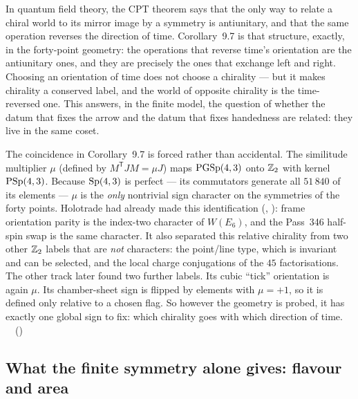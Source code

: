 \begin{physical}
In quantum field theory, the CPT theorem says that the only way to relate a chiral world to
its mirror image by a symmetry is antiunitary, and that the same operation reverses the
direction of time. Corollary~9.7 is that structure, exactly, in the forty-point geometry: the
operations that reverse time's orientation are the antiunitary ones, and they are precisely
the ones that exchange left and right. Choosing an orientation of time does not choose a
chirality --- but it makes chirality a conserved label, and the world of opposite chirality
is the time-reversed one. This answers, in the finite model, the question of whether the
datum that fixes the arrow and the datum that fixes handedness are related: they live in the
same coset. \tierB
\end{physical}

The coincidence in Corollary~9.7 is forced rather than accidental. The similitude multiplier $\mu$
(defined by $M^{\mathsf T}JM=\mu J$) maps $\mathrm{PGSp}(4,3)$ onto $\mathbb{Z}_2$ with kernel $\mathrm{PSp}(4,3)$. Because
$\mathrm{Sp}(4,3)$ is perfect --- its commutators generate all $51\,840$ of its elements --- $\mu$ is the \emph{only}
nontrivial sign character on the symmetries of the forty points. Holotrade had already made this
identification (, ): frame orientation parity is the index-two character of
$W(E_6)$, and the Pass~346 half-spin swap is the same character. It also separated this relative chirality
from two other $\mathbb{Z}_2$ labels that are \emph{not} characters: the point/line type, which is invariant and can
be selected, and the local charge conjugations of the $45$ factorisations. The other track later found two
further labels. Its cubic ``tick'' orientation is again $\mu$. Its chamber-sheet sign is flipped by
elements with $\mu=+1$, so it is defined only relative to a chosen flag. So however the geometry is
probed, it has exactly one global sign to fix: which chirality goes with which direction of time.
\tierT\ \tierC\ ()

\subsection{What the finite symmetry alone gives: flavour and area}

